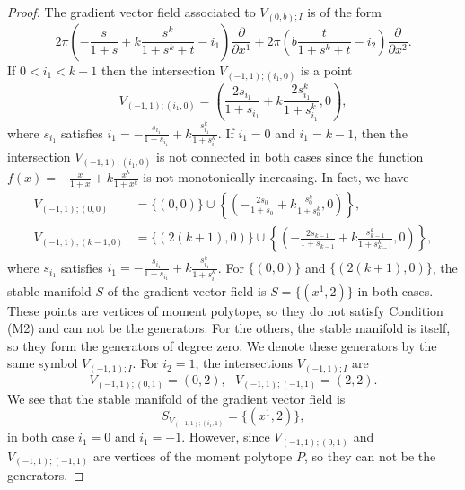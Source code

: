 \documentclass[10pt,a4paper]{amsart}
\newcommand{\del}{{\partial}}
\begin{document}
\begin{proof}
The gradient vector field associated to $V_{(0,b);I}$ is of the form
\begin{equation*}
2\pi\left(-\frac{s}{1+s}+k\frac{s^k}{1+s^k+t}-i_1\right)\frac{\del}{\del x^1} + 2\pi\left(b\frac{t}{1+s^k+t} - i_2 \right)\frac{\del}{\del x^2}.
\end{equation*}
If $0<i_1<k-1$ then the intersection $V_{(-1,1);(i_1,0)}$ is a point
\begin{equation*}
V_{(-1,1);(i_1,0)} = \left( \frac{2s_{i_1}}{1+s_{i_1}} + k\frac{2s_{i_1}^k}{1+s_{i_1}^k} , 0 \right),
\end{equation*} 
where $s_{i_1}$ satisfies $i_1 = -\frac{s_{i_1}}{1+s_{i_1}} + k\frac{s_{i_1}^k}{1+s_{i_1}^k}$.
If $i_1=0$ and $i_1=k-1$, then the intersection $V_{(-1,1);(i_1,0)}$ is not connected in both cases since the function $f(x)=-\frac{x}{1+x}+k\frac{x^k}{1+x^k}$ is not monotonically increasing. In fact, we have
\begin{equation*}
\begin{split}
V_{(-1,1);(0,0)} &= \{(0,0)\}\cup\left\{\left(-\frac{2s_{0}}{1+s_{0}} + k\frac{s_{0}^k}{1+s_{0}^k},0\right)\right\},\\
V_{(-1,1);(k-1,0)} &= \{(2(k+1),0)\}\cup\left\{\left(-\frac{2s_{k-1}}{1+s_{k-1}} + k\frac{s_{k-1}^k}{1+s_{k-1}^k},0\right)\right\},
\end{split}
\end{equation*}
where $s_{i_1}$ satisfies $i_1 = -\frac{s_{i_1}}{1+s_{i_1}} + k\frac{s_{i_1}^k}{1+s_{i_1}^k}$. For $\{(0,0)\}$ and $\{(2(k+1),0)\}$, the stable manifold $S$ of the gradient vector field is $S=\{(x^1,2)\}$ in both cases. These points are vertices of moment polytope, so they do not satisfy Condition (M2) and can not be the generators. For the others, the stable manifold is itself, so they form the generators of degree zero. We denote these generators by the same symbol $V_{(-1,1);I}$.
For $i_2=1$, the intersections $V_{(-1,1);I}$ are
\begin{equation*}
V_{(-1,1);(0,1)} = \left( 0 , 2 \right),\ \ \ V_{(-1,1);(-1,1)} = \left( 2 , 2 \right).
\end{equation*}
We see that the stable manifold of the gradient vector field is
\begin{equation*}
S_{V_{(-1,1);(i_1,1)}}=\{(x^1,2)\},
\end{equation*}
in both case $i_1=0$ and $i_1=-1$. However, since $V_{(-1,1);(0,1)}$ and $V_{(-1,1);(-1,1)}$ are vertices of the moment polytope $P$, so they can not be the generators.
\end{proof}
\end{document}
